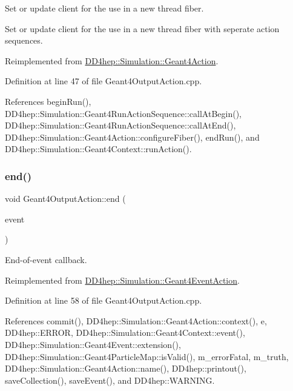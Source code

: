 Set or update client for the use in a new thread fiber. 

Set or update client for the use in a new thread fiber with seperate action sequences. 

Reimplemented from \hyperlink{class_d_d4hep_1_1_simulation_1_1_geant4_action_a6adc7138508303e4e417cb48a737ab19}{D\+D4hep\+::\+Simulation\+::\+Geant4\+Action}.



Definition at line 47 of file Geant4\+Output\+Action.\+cpp.



References begin\+Run(), D\+D4hep\+::\+Simulation\+::\+Geant4\+Run\+Action\+Sequence\+::call\+At\+Begin(), D\+D4hep\+::\+Simulation\+::\+Geant4\+Run\+Action\+Sequence\+::call\+At\+End(), D\+D4hep\+::\+Simulation\+::\+Geant4\+Action\+::configure\+Fiber(), end\+Run(), and D\+D4hep\+::\+Simulation\+::\+Geant4\+Context\+::run\+Action().

\hypertarget{class_d_d4hep_1_1_simulation_1_1_geant4_output_action_a6fa4e933973a42a00b7be10292619780}{}\label{class_d_d4hep_1_1_simulation_1_1_geant4_output_action_a6fa4e933973a42a00b7be10292619780} 
\subsubsection{\texorpdfstring{end()}{end()}}
{\footnotesize\ttfamily void Geant4\+Output\+Action\+::end (\begin{DoxyParamCaption}\item[{const G4\+Event $\ast$}]{event }\end{DoxyParamCaption})\hspace{0.3cm}{\ttfamily [virtual]}}



End-\/of-\/event callback. 



Reimplemented from \hyperlink{class_d_d4hep_1_1_simulation_1_1_geant4_event_action_af131bad73c28da3419af7c29e0b8c250}{D\+D4hep\+::\+Simulation\+::\+Geant4\+Event\+Action}.



Definition at line 58 of file Geant4\+Output\+Action.\+cpp.



References commit(), D\+D4hep\+::\+Simulation\+::\+Geant4\+Action\+::context(), e, D\+D4hep\+::\+E\+R\+R\+OR, D\+D4hep\+::\+Simulation\+::\+Geant4\+Context\+::event(), D\+D4hep\+::\+Simulation\+::\+Geant4\+Event\+::extension(), D\+D4hep\+::\+Simulation\+::\+Geant4\+Particle\+Map\+::is\+Valid(), m\+\_\+error\+Fatal, m\+\_\+truth, D\+D4hep\+::\+Simulation\+::\+Geant4\+Action\+::name(), D\+D4hep\+::printout(), save\+Collection(), save\+Event(), and D\+D4hep\+::\+W\+A\+R\+N\+I\+NG.

